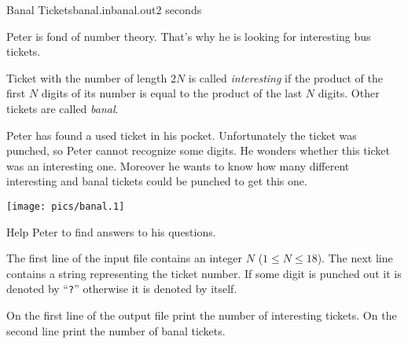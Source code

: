 \begin{problem}{Banal Tickets}{banal.in}{banal.out}{2 seconds}

Peter is fond of number theory. That's why he is looking for interesting
bus tickets.

Ticket with the number of length $2N$ is called {\em interesting} if 
the product of the first $N$ digits of its number is equal to the product 
of the last $N$ digits. Other tickets are called {\em banal}.

Peter has found a used ticket in his pocket. Unfortunately the ticket 
was punched, so Peter cannot recognize some digits. He wonders whether 
this ticket was an interesting one. Moreover he wants to know how many
different interesting and banal tickets could be punched to get this one.

\begin{center}\texttt{[image: pics/banal.1]}\end{center}

Help Peter to find answers to his questions.

\InputFile

The first line of the input file contains an integer $N$ ($1\leq N\leq 18$).
The next line contains a string representing the ticket number.
If some digit is punched out it is denoted by ``{\tt ?}'' otherwise
it is denoted by itself.

\OutputFile

On the first line of the output file print the number of interesting tickets.
On the second line print the number of banal tickets.

\Example

\begin{example}
\end{example}

\end{problem}
